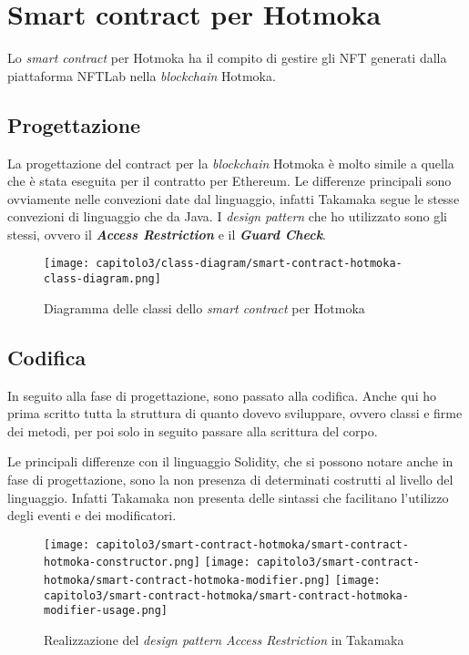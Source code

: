 
\section{Smart contract per Hotmoka}
Lo \textit{smart contract} per Hotmoka ha il compito di gestire gli NFT generati dalla piattaforma NFTLab nella \textit{blockchain} Hotmoka.

\subsection{Progettazione}
La progettazione del contract per la \textit{blockchain} Hotmoka è molto simile a quella che è stata eseguita per il contratto per Ethereum. Le differenze principali sono ovviamente nelle convezioni date dal linguaggio, infatti Takamaka segue le stesse convezioni di linguaggio che da Java. 
I \textit{design pattern} che ho utilizzato sono gli stessi, ovvero il \textbf{\textit{Access Restriction}} e il \textbf{\textit{Guard Check}}.

\begin{figure}[h!]
  \centering
  \texttt{[image: capitolo3/class-diagram/smart-contract-hotmoka-class-diagram.png]}
  \caption{Diagramma delle classi dello \textit{smart contract} per Hotmoka}
\end{figure}

\subsection{Codifica}
In seguito alla fase di progettazione, sono passato alla codifica. Anche qui ho prima scritto tutta la struttura di quanto dovevo sviluppare, ovvero classi e firme dei metodi, per poi solo in seguito passare alla scrittura del corpo.

Le principali differenze con il linguaggio Solidity, che si possono notare anche in fase di progettazione, sono la non presenza di determinati costrutti al livello del linguaggio. Infatti Takamaka non presenta delle sintassi che facilitano l'utilizzo degli eventi e dei modificatori.

\begin{figure}[h!]
  \centering
  \texttt{[image: capitolo3/smart-contract-hotmoka/smart-contract-hotmoka-constructor.png]}
  \texttt{[image: capitolo3/smart-contract-hotmoka/smart-contract-hotmoka-modifier.png]}
  \texttt{[image: capitolo3/smart-contract-hotmoka/smart-contract-hotmoka-modifier-usage.png]}
  \caption{Realizzazione del \textit{design pattern Access Restriction} in Takamaka}
\end{figure}

